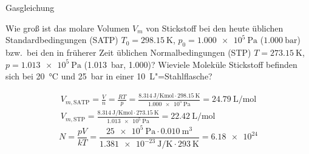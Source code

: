 \documentclass[DIV11]{scrartcl}
\begin{document}
\begin{center}
  \Huge\sffamily Gasgleichung
\end{center}


\begin{question}[name=Ideales Gas]
\begin{tasks}
  \task Wie groß ist das molare Volumen $V_m$ von Stickstoff bei den heute
    üblichen Standardbedingungen (SATP) $T_0 = \SI{298.15}{\kelvin}$, $p_0 =
    \SI{1.000e5}{\pascal}$ ($\SI{1.000}{\bar}$) bzw.\ bei den in früherer Zeit
    üblichen Normalbedingungen (STP) $T = \SI{273.15}{\kelvin}$, $p =
    \SI{1.013e5}{\pascal}$ (\SI{1.013}{\bar}, \SI{1.000}{\atm})?
  \task Wieviele Moleküle Stickstoff befinden sich bei \SI{20}{\celsius} und
  \SI{25}{\bar} in einer \SI{10}{\liter}"=Stahlflasche?
\end{tasks}
\end{question}
\begin{solution}[name=Ideales Gas]
\begin{tasks}
  \task
  \begin{gather*}
    V_{m,\text{SATP}}
      = \frac{V}{n}
      = \frac{RT}{p}
      = \frac
          {
            \SI[sticky-per]{8.314}{\joule\per\kelvin\mole} \cdot
            \SI{298.15}{\kelvin}
          }
          {\SI{1.000e5}{\pascal}}
      = \SI{24.79}{\liter\per\mole} \\
   V_{m,\text{STP}}
      = \frac
          {
            \SI[sticky-per]{8.314}{\joule\per\kelvin\mole} \cdot
            \SI{273.15}{\kelvin}
          }
          {\SI{1.013e5}{\pascal}}
     = \SI{22.42}{\liter\per\mole}
  \end{gather*}
  \task
    \[
      N = \frac{pV}{kT}
        = \frac
            {\SI{25e5}{\pascal}\cdot\SI{0.010}{\cubic\metre}}
            {\SI{1.381e-23}{\joule\per\kelvin}\cdot\SI{293}{\kelvin}}
        = \num{6.18e24}
    \]
\end{tasks}
\end{solution}
\end{document}
